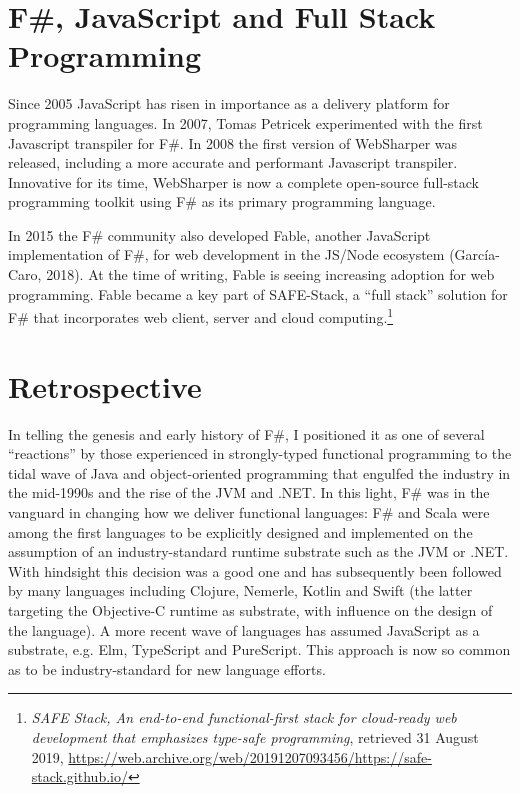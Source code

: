 \documentclass[acmsmall]{acmart}\settopmatter{}
\begin{document}
\section*{F\#, JavaScript and Full Stack Programming}

Since 2005 JavaScript has risen in importance as a delivery platform for programming languages. In 2007, Tomas Petricek
experimented with the first Javascript transpiler for F\#. In 2008 the first version of WebSharper was released, including
a more accurate and performant Javascript transpiler.  Innovative for its time, WebSharper is now a complete
open-source full-stack programming toolkit using F\# as its primary programming language.

In 2015 the F\# community also developed Fable, another JavaScript implementation of F\#, for web development
in the JS/Node ecosystem (García-Caro, 2018). At the time of writing, Fable is seeing increasing adoption for web
programming.  Fable became a key part of SAFE-Stack, a “full stack” solution for F\# that incorporates web client, server and cloud
computing.\footnote{\textit{SAFE Stack, An end-to-end functional-first stack for cloud-ready web development that emphasizes type-safe programming}, retrieved 31 August 2019,  \url{https://web.archive.org/web/20191207093456/https://safe-stack.github.io/}}


\section*{Retrospective}

In telling the genesis and early history of F\#, I positioned it as one of several “reactions” by those experienced
in strongly-typed functional programming to the tidal wave of Java and object-oriented programming that
engulfed the industry in the mid-1990s and the rise of the JVM and .NET.  In this light, F\# was in the vanguard
in changing how we deliver functional languages: F\# and Scala were among the first languages to be explicitly
designed and implemented on the assumption of an industry-standard runtime substrate such as the JVM or .NET.
With hindsight this decision was a good one and has subsequently been followed by many languages including
Clojure, Nemerle, Kotlin and Swift (the latter targeting the Objective-C runtime as substrate, with influence on the design of the language). A more recent
wave of languages has assumed JavaScript as a substrate, e.g. Elm, TypeScript and PureScript.  This approach is
now so common as to be industry-standard for new language efforts.
\end{document}

